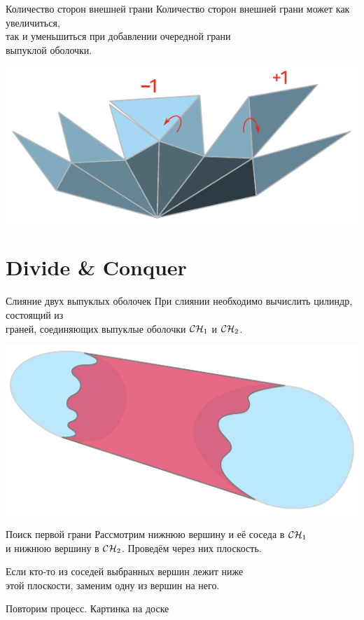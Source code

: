 \documentclass[12pt,aspectratio=169,svgnames]{beamer}
\begin{document}
\begin{frame}{Количество сторон внешней грани}
	Количество сторон внешней грани может как увеличиться, \\
	так и уменьшиться при добавлении очередной грани \\
	выпуклой оболочки.
\begin{center} \includegraphics[scale=0.92]{svg/giftWrapping} \end{center}
\end{frame}


\section{Divide \& Conquer}

\begin{frame}{Слияние двух выпуклых оболочек}
	При слиянии необходимо вычислить цилиндр, состоящий из \\
	граней, соединяющих выпуклые оболочки \(\mathcal{C}\mathcal{H}_1\) и \(\mathcal{C}\mathcal{H}_2\).
\begin{center} \includegraphics[scale=1.04]{svg/CHconquer} \end{center}
\end{frame}


\begin{frame}{Поиск первой грани}
	Рассмотрим нижнюю вершину и её соседа в \(\mathcal{C}\mathcal{H}_1\) \\
	и нижнюю вершину в \(\mathcal{C}\mathcal{H}_2\). Проведём через них плоскость.

	Если кто-то из соседей выбранных вершин лежит ниже \\
	этой плоскости, заменим одну из вершин на него.

	Повторим процесс.\hspace{2.5cm}
	{\footnotesize \textcolor{white!46!dgray}{Картинка на доске}}
\end{frame}
\end{document}
